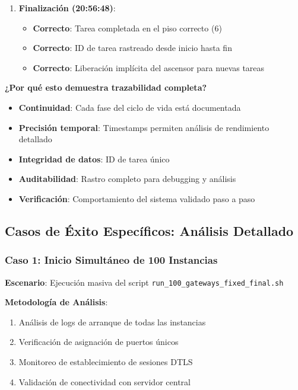 \begin{enumerate}
    \item \textbf{Finalización (20:56:48)}:
    \begin{itemize}
        \item \textcolor{successgreen}{\textbf{Correcto}}: Tarea completada en el piso correcto (6)
        \item \textcolor{successgreen}{\textbf{Correcto}}: ID de tarea rastreado desde inicio hasta fin
        \item \textcolor{successgreen}{\textbf{Correcto}}: Liberación implícita del ascensor para nuevas tareas
    \end{itemize}
\end{enumerate}

\textbf{¿Por qué esto demuestra trazabilidad completa?}
\begin{itemize}
    \item \textbf{Continuidad}: Cada fase del ciclo de vida está documentada
    \item \textbf{Precisión temporal}: Timestamps permiten análisis de rendimiento detallado
    \item \textbf{Integridad de datos}: ID de tarea único
    \item \textbf{Auditabilidad}: Rastro completo para debugging y análisis
    \item \textbf{Verificación}: Comportamiento del sistema validado paso a paso
\end{itemize}

\subsection{Casos de Éxito Específicos: Análisis Detallado}\label{subsec:casos-exito}

\subsubsection{Caso 1: Inicio Simultáneo de 100 Instancias}

\textbf{Escenario}: Ejecución masiva del script \texttt{run\_100\_gateways\_fixed\_final.sh}

\textbf{Metodología de Análisis}:
\begin{enumerate}
    \item Análisis de logs de arranque de todas las instancias
    \item Verificación de asignación de puertos únicos
    \item Monitoreo de establecimiento de sesiones DTLS
    \item Validación de conectividad con servidor central
\end{enumerate}

